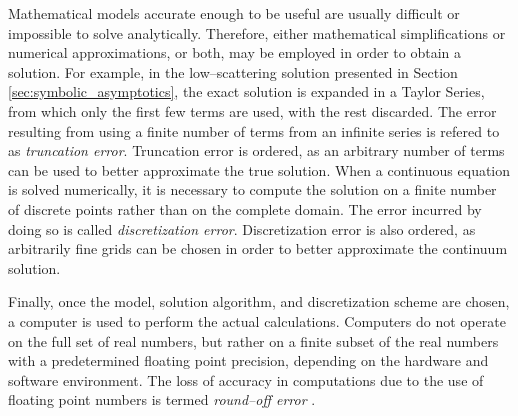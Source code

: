 Mathematical models accurate enough to be useful are usually difficult or impossible to solve analytically.
Therefore, either mathematical simplifications or numerical approximations, or both, may be employed in order to obtain a solution.
For example, in the low--scattering solution presented in Section \ref{sec:symbolic_asymptotics}, the exact solution is expanded in a Taylor Series, from which only the first few terms are used, with the rest discarded.
The error resulting from using a finite number of terms from an infinite series is refered to as \textit{truncation error}.
Truncation error is ordered, as an arbitrary number of terms can be used to better approximate the true solution.
When a continuous equation is solved numerically, it is necessary to compute the solution on a finite number of discrete points rather than on the complete domain.
The error incurred by doing so is called \textit{discretization error}.
Discretization error is also ordered, as arbitrarily fine grids can be chosen in order to better approximate the continuum solution.

Finally, once the model, solution algorithm, and discretization scheme are chosen, a computer is used to perform the actual calculations.
Computers do not operate on the full set of real numbers, but rather on a finite subset of the real numbers with a predetermined floating point precision, depending on the hardware and software environment.
The loss of accuracy in computations due to the use of floating point numbers is termed \textit{round--off error} \cite{roache_verification_1998}.


